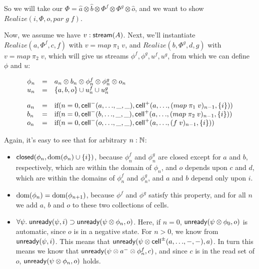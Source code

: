 \documentclass{article}
\begin{document}
So we will take our $\Phi = \hat{a} \otimes \hat{b} \otimes \Phi^f \otimes \Phi^g \otimes \hat{o}$, and we want to show $Realize(i, \Phi, o, par\;g\; f)$. 

Now, we assume we have $v:\mbox{\textsf{{stream}}}({A})$. Next, we'll instantiate
$Realize(a, \Phi^f, c, f)$ with $v = map\;\pi_1\;v$, and 
$Realize(b, \Phi^g, d, g)$ with $v = map\;\pi_2\;v$, which will give 
us streams $\phi^f, \phi^g, u^f, u^g$, from which we can define $\phi$ and $u$: 

\begin{displaymath}
\begin{array}{lcl}
  \phi_n & = & a_n \otimes b_n \otimes \phi^f_n \otimes \phi^g_n \otimes o_n \\
  u_n    & = & \{{a, b, o}\} \cup u^f_n \cup u^g_n \\[1em]

  a_n & = & \mbox{if}(n = 0, \mbox{\textsf{{cell}}}^{-}({a}, {\ldots}, {\_}, {\_}), \mbox{\textsf{{cell}}}^{+}({a}, {\ldots}, {(map\;\pi_1\;v)_{n-1}}, {\{{i}\}})) \\
  b_n & = & \mbox{if}(n = 0, \mbox{\textsf{{cell}}}^{-}({b}, {\ldots}, {\_}, {\_}), \mbox{\textsf{{cell}}}^{+}({a}, {\ldots}, {(map\;\pi_2\;v)_{n-1}}, {\{{i}\}})) \\
  o_n & = & \mbox{if}(n = 0, \mbox{\textsf{{cell}}}^{-}({o}, {\ldots}, {\_}, {\_}), \mbox{\textsf{{cell}}}^{+}({a}, {\ldots}, {(f \;v)_{n-1}}, {\{{i}\}})) \\
\end{array}
\end{displaymath}

Again, it's easy to see that for arbitrary $n:\mathbb{N}$: 

\begin{itemize}
\item $\mbox{\textsf{{closed}}}({\phi_n}, {\mbox{dom}({\phi_n}) \cup \{{i}\}})$, because $\phi^f_n$ and $\phi^g_n$
are closed except for $a$ and $b$, respectively, which are within the domain of $\phi_n$,
and $o$ depends upon $c$ and $d$, which are within the domains of $\phi^f_n$ and $\phi^g_n$,
and $a$ and $b$ depend only upon $i$. 

\item $\mbox{dom}({\phi_n}) = \mbox{dom}({\phi_{n+1}})$, because $\phi^f$ and $\phi^g$ satisfy
this property, and for all $n$ we add $a$, $b$ and $o$ to these two collections of cells. 

\item $\forall \psi.\; \mbox{\textsf{{unready}}}({\psi}, {i}) \supset \mbox{\textsf{{unready}}}({\psi \otimes \phi_n}, {o})$. 
Here, if $n = 0$, $\mbox{\textsf{{unready}}}({\psi \otimes \phi_0}, {o})$ is automatic, since $o$ is in
a negative state. For $n > 0$, we know from $\mbox{\textsf{{unready}}}({\psi}, {i})$. This means that 
$\mbox{\textsf{{unready}}}({\psi \otimes \mbox{\textsf{{cell}}}^{\pm}({a}, {\ldots}, {-}, {-})}, {a})$. In turn this means we know that 
$\mbox{\textsf{{unready}}}({\psi \otimes a^- \otimes \phi^f_n}, {c})$, and since $c$ is in the read set
of $o$, $\mbox{\textsf{{unready}}}({\psi \otimes \phi_n}, {o})$ holds. 
\end{itemize}
\end{document}
